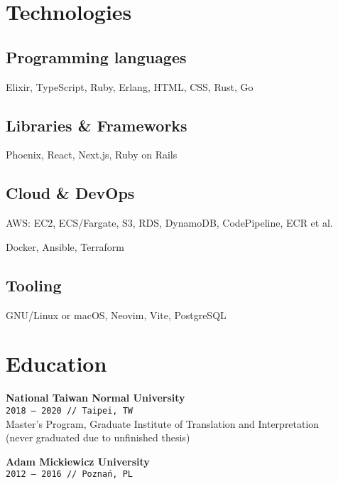 \documentclass[10pt,a4paper]{article}
\newcommand{\project}[3]{\par\vspace{1em}\textbf{\normalsize #1}\\{\footnotesize\texttt{#2 // #3}}\\[4pt]}
\begin{document}
\begin{minipage}[t]{0.3\textwidth}
  \raggedright
  \section{Technologies}

  \subsection{Programming languages}

  \small
  Elixir, TypeScript, Ruby, Erlang, HTML, CSS, Rust, Go
  \vspace{4pt}

  \subsection{Libraries \& Frameworks}

  \small
  Phoenix, React, Next.js, Ruby on Rails
  \vspace{4pt}

  \subsection{Cloud \& DevOps}

  \small
  AWS: EC2, ECS/Fargate, S3, RDS, DynamoDB, CodePipeline, ECR et al.

  Docker, Ansible, Terraform
  \vspace{4pt}

  \subsection{Tooling}

  \small
  GNU/Linux or macOS, Neovim, Vite, PostgreSQL
  \vspace{12pt}

  \section{Education}
  \vspace{-6pt}

  \project{National Taiwan Normal University}{2018 {–} 2020}{Taipei, TW}

  \small Master's Program, Graduate Institute of Translation and Interpretation\\ (never graduated due to unfinished thesis)

  \project{Adam Mickiewicz University}{2012 {–} 2016}{Poznań, PL}


\end{minipage}
\end{document}
